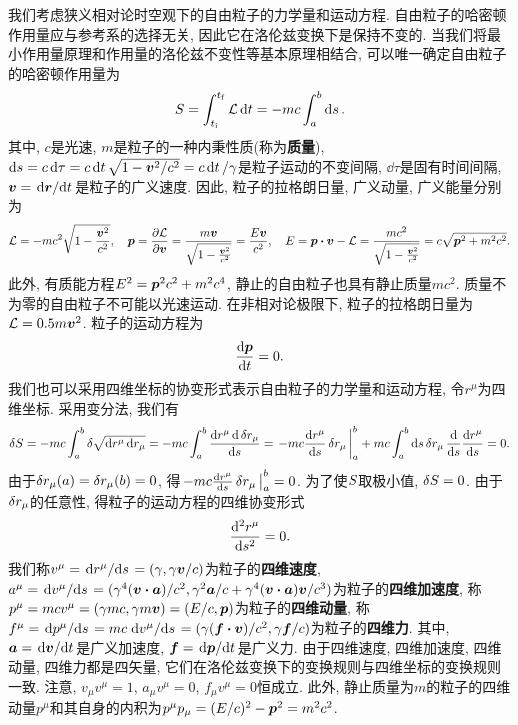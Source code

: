 我们考虑狭义相对论时空观下的自由粒子的力学量和运动方程. 自由粒子的哈密顿作用量应与参考系的选择无关, 因此它在洛伦兹变换下是保持不变的. 当我们将最小作用量原理和作用量的洛伦兹不变性等基本原理相结合, 可以唯一确定自由粒子的哈密顿作用量为
\begin{equation*}
    S = \int_{t_{\mathrm{i}}}^{t_{\mathrm{f}}} \mathcal{L} \dd{t} = -mc \int_a^b \dd{s}.
\end{equation*}
其中, $ c $是光速, $ m $是粒子的一种内秉性质(称为\textbf{质量}), $ \dd{s} = c \dd{\tau} = c\dd{t} \sqrt{1-\vb*{v}^2/c^2} = c \dd{t}/\gamma $是粒子运动的不变间隔, $ \dd{\tau} $是固有时间间隔, $ \vb*{v} = \dv*{\vb*{r}}{t} $是粒子的广义速度. 因此, 粒子的拉格朗日量, 广义动量, 广义能量分别为
\begin{equation*}
    \lagr = -mc^2 \sqrt{1-\frac{\vb*{v}^2}{c^2}}, \quad \vb*{p} = \pdv{\lagr}{\vb*{v}} = \frac{m\vb*{v}}{\sqrt{1-\frac{\vb*{v}^2}{c^2}}} = \frac{E \vb*{v}}{c^2}, \quad E = \vb*{p} \vdot \vb*{v} - \lagr = \frac{mc^2}{\sqrt{1-\frac{\vb*{v}^2}{c^2}}} = c \sqrt{\vb*{p}^2 + m^2 c^2}.
\end{equation*}
此外, 有质能方程$ E^2 = \vb*{p}^2 c^2 + m^2 c^4 $, 静止的自由粒子也具有静止质量$ mc^2 $. 质量不为零的自由粒子不可能以光速运动. 在非相对论极限下, 粒子的拉格朗日量为$ \mathcal{L} = 0.5 m\vb*{v}^2 $. 粒子的运动方程为
\begin{equation*}
    \dv{\vb*{p}}{t}=0.
\end{equation*}
我们也可以采用四维坐标的协变形式表示自由粒子的力学量和运动方程, 令$ r^{\mu} $为四维坐标. 采用变分法, 我们有
\begin{equation*}
    \var{\action} = -mc \int_a^b \var{\sqrt{\dd{r^{\mu}} \dd{r_{\mu}}}} = -mc \int_a^b \frac{\dd{r^{\mu}} \dd{\var{r_{\mu}}}}{\dd{s}} = \eval{-mc \dv{r^{\mu}}{s} \var{r_{\mu}}}_a^b + mc \int_a^b \dd{s} \var{r_{\mu}} \dv{s} \dv{r^{\mu}}{s} = 0.
\end{equation*}
由于$ \var{r_{\mu}(a)}=\var{r_{\mu}(b)}=0 $, 得$ \eval{-mc \dv{r^{\mu}}{s} \var{r_{\mu}}}_a^b=0 $. 为了使$ S $取极小值, $ \var{S}=0 $. 由于$ \var{r_{\mu}} $的任意性, 得粒子的运动方程的四维协变形式
\begin{equation*}
    \dv[2]{r^{\mu}}{s} = 0.
\end{equation*}
我们称$ v^{\mu}=\dv*{r^{\mu}}{s}=(\gamma,\gamma \vb*{v}/c) $为粒子的\textbf{四维速度}, $ a^{\mu}=\dv*{v^{\mu}}{s}=(\gamma^4 (\vb*{v} \vdot \vb*{a})/c^2,\gamma^2\vb*{a}/c + \gamma^4 (\vb*{v} \vdot \vb*{a}) \vb*{v}/c^3) $为粒子的\textbf{四维加速度}, 称$ p^{\mu} = mcv^{\mu}= (\gamma mc, \gamma m \vb*{v}) = (E/c,\vb*{p}) $为粒子的\textbf{四维动量}, 称$ f^{\mu}=\dv*{p^{\mu}}{s}=mc\dv*{v^{\mu}}{s}=(\gamma (\vb*{f} \vdot \vb*{v})/c^2,\gamma\vb*{f}/c) $为粒子的\textbf{四维力}. 其中, $ \vb*{a}=\dv*{\vb*{v}}{t} $是广义加速度, $ \vb*{f}=\dv*{\vb*{p}}{t} $是广义力. 由于四维速度, 四维加速度, 四维动量, 四维力都是四矢量, 它们在洛伦兹变换下的变换规则与四维坐标的变换规则一致. 注意, $ v_{\mu} v^{\mu}=1 $, $ a_{\mu} v^{\mu}=0 $, $ f_{\mu} v^{\mu} = 0 $恒成立. 此外, 静止质量为$ m $的粒子的四维动量$ p^{\mu} $和其自身的内积为$ p^{\mu} p_{\mu} = (E/c)^2 - \vb*{p}^2 = m^2 c^2 $.

